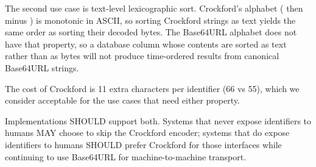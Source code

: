 The second use case is text-level lexicographic sort. Crockford's alphabet ( then  minus ) is monotonic in ASCII, so sorting Crockford strings as text yields the same order as sorting their decoded bytes. The Base64URL alphabet does not have that property, so a database column whose contents are sorted as text rather than as bytes will not produce time-ordered results from canonical Base64URL strings.

The cost of Crockford is 11 extra characters per identifier (66 vs 55), which we consider acceptable for the use cases that need either property.

Implementations SHOULD support both. Systems that never expose identifiers to humans MAY choose to skip the Crockford encoder; systems that do expose identifiers to humans SHOULD prefer Crockford for those interfaces while continuing to use Base64URL for machine-to-machine transport.

